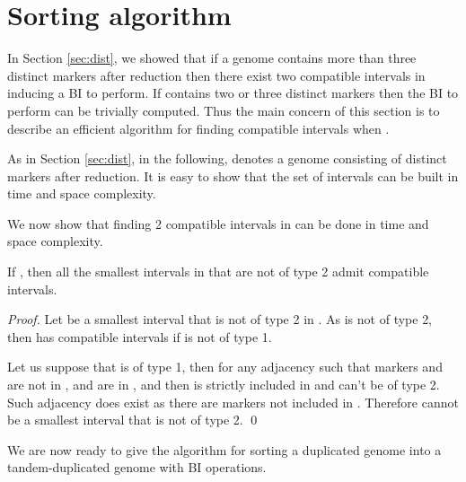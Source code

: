 \documentclass{llncs}
\begin{document}
\section{Sorting algorithm}
\label{sec:scenario}



In Section \ref{sec:dist}, we showed that if a genome  contains more than 
three distinct markers after reduction then there exist two compatible 
intervals in  inducing a BI to perform.
If  contains two or three distinct markers then the BI to perform can be 
trivially computed.
Thus the main concern of this section is to describe an efficient algorithm 
for finding compatible intervals when .


As in Section \ref{sec:dist}, in the following,  denotes a genome consisting 
of  distinct markers after reduction. 
It is easy to show that the set of intervals 
 can be built in  time and space complexity.




We now show that finding 2 compatible intervals in   can be done in  time and space complexity.


\begin{property}
If  , then all the smallest intervals in  that are not of type 2 admit compatible intervals.
\label{smallestOK}
\end{property}

\begin{proof}











    Let  be a smallest interval that is not of type 2 in
    . As  is not of type 2, then  has compatible
    intervals if  is not of type 1.

Let us suppose that  is of type 1, then for any adjacency  such 
that markers  and  are not in ,   and  are in , 
and then  is strictly included in  and  can't be of 
type 2. Such adjacency does exist as there are  markers not included in .
Therefore  cannot be a smallest interval that is not of type 2.
\qed
\end{proof}











We are now ready to give the algorithm for sorting a duplicated genome  into a tandem-duplicated genome with  BI operations.
\end{document}
